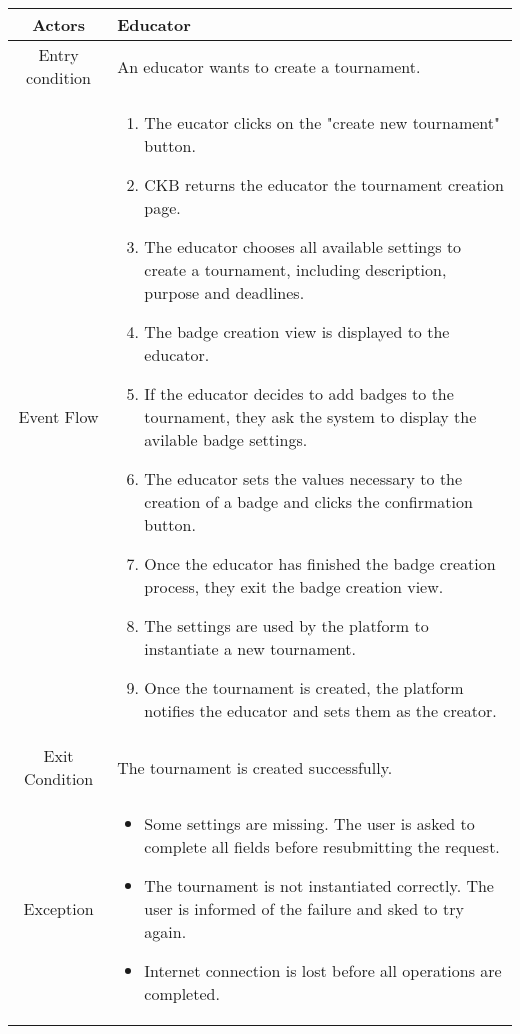 \documentclass[a4paper, 11pt, titlepage]{article}
\begin{document}
\begin{center}
    \begin{tabularx}{\linewidth} {|c|X|}
        \hline 
        Actors & Educator\\
        \hline 
        Entry condition &
        An educator wants to create a tournament.\\
        \hline 
        Event Flow &\begin{enumerate}
            \item The eucator clicks on the "create new tournament" button.
            \item CKB returns the educator the tournament creation page.
            \item The educator chooses all available settings to create a tournament, including description, purpose and deadlines.
            \item The badge creation view is displayed to the educator.
            \item If the educator decides to add badges to the tournament, they ask the system to display the avilable badge settings.
            \item The educator sets the values necessary to the creation of a badge and clicks the confirmation button.
            \item Once the educator has finished the badge creation process, they exit the badge creation view.
            \item The settings are used by the platform to instantiate a new tournament.
            \item Once the tournament is created, the platform notifies the educator and sets them as the creator.
        \end{enumerate}\\
        \hline 
        Exit Condition &
        The tournament is created successfully.\\
        \hline 
        Exception & 
        \begin{itemize}
            \item Some settings are missing. The user is asked to complete all fields before resubmitting the request.
            \item The tournament is not instantiated correctly. The user is informed of the failure and sked to try again.
            \item Internet connection is lost before all operations are completed. 
        \end{itemize}\\
        \hline
    \end{tabularx}
\end{center}
\end{document}
